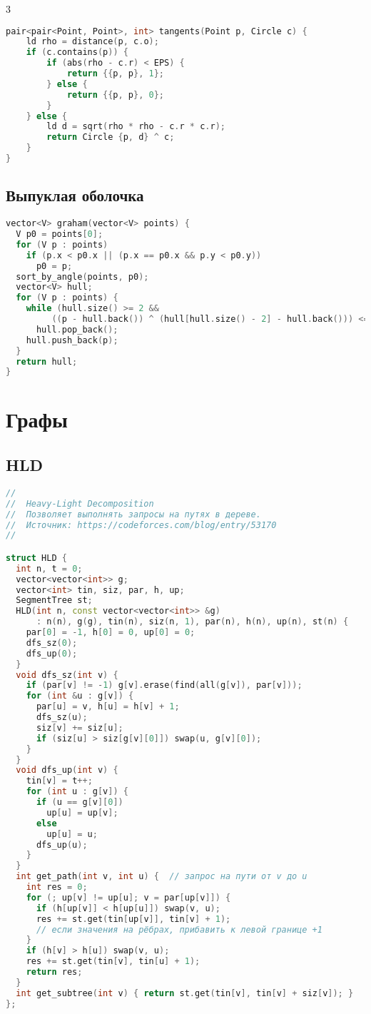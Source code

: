 \documentclass[10pt,a4paper,landscape,twosided]{extarticle}
\begin{document}
\begin{multicols}{3}
\begin{lstlisting}[language=C++]
pair<pair<Point, Point>, int> tangents(Point p, Circle c) {
    ld rho = distance(p, c.o);
    if (c.contains(p)) {
        if (abs(rho - c.r) < EPS) {
            return {{p, p}, 1};
        } else {
            return {{p, p}, 0};
        }
    } else {
        ld d = sqrt(rho * rho - c.r * c.r);
        return Circle {p, d} ^ c;
    }
}
\end{lstlisting}

\subsection{Выпуклая оболочка}
\begin{lstlisting}[language=C++]
vector<V> graham(vector<V> points) {
  V p0 = points[0];
  for (V p : points)
    if (p.x < p0.x || (p.x == p0.x && p.y < p0.y))
      p0 = p;
  sort_by_angle(points, p0);
  vector<V> hull;
  for (V p : points) {
    while (hull.size() >= 2 &&
         ((p - hull.back()) ^ (hull[hull.size() - 2] - hull.back())) <= 0)
      hull.pop_back();
    hull.push_back(p);
  }
  return hull;
}
\end{lstlisting}

\section{Графы}

\subsection{HLD}
\begin{lstlisting}[language=C++]
//
//  Heavy-Light Decomposition
//  Позволяет выполнять запросы на путях в дереве.
//  Источник: https://codeforces.com/blog/entry/53170
//

struct HLD {
  int n, t = 0;
  vector<vector<int>> g;
  vector<int> tin, siz, par, h, up;
  SegmentTree st;
  HLD(int n, const vector<vector<int>> &g)
      : n(n), g(g), tin(n), siz(n, 1), par(n), h(n), up(n), st(n) {
    par[0] = -1, h[0] = 0, up[0] = 0;
    dfs_sz(0);
    dfs_up(0);
  }
  void dfs_sz(int v) {
    if (par[v] != -1) g[v].erase(find(all(g[v]), par[v]));
    for (int &u : g[v]) {
      par[u] = v, h[u] = h[v] + 1;
      dfs_sz(u);
      siz[v] += siz[u];
      if (siz[u] > siz[g[v][0]]) swap(u, g[v][0]);
    }
  }
  void dfs_up(int v) {
    tin[v] = t++;
    for (int u : g[v]) {
      if (u == g[v][0])
        up[u] = up[v];
      else
        up[u] = u;
      dfs_up(u);
    }
  }
  int get_path(int v, int u) {  // запрос на пути от v до u
    int res = 0;
    for (; up[v] != up[u]; v = par[up[v]]) {
      if (h[up[v]] < h[up[u]]) swap(v, u);
      res += st.get(tin[up[v]], tin[v] + 1);
      // если значения на рёбрах, прибавить к левой границе +1
    }
    if (h[v] > h[u]) swap(v, u);
    res += st.get(tin[v], tin[u] + 1);
    return res;
  }
  int get_subtree(int v) { return st.get(tin[v], tin[v] + siz[v]); }
};
\end{lstlisting}


\end{multicols}
\end{document}
